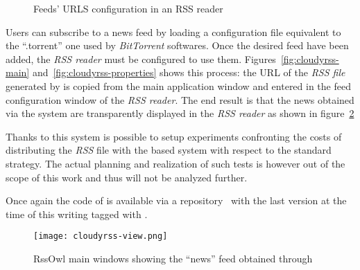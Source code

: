 \begin{figure}[h!]
  \centering
  \caption{Feeds' URLS configuration in an RSS reader}
  \label{fig:cloudyrss-feeds}
\end{figure}

\clearpage
Users can subscribe to a news feed by loading a
configuration file equivalent to the ``.torrent'' one used by
\textit{BitTorrent} softwares. Once the desired feed have been
added, the \textit{RSS reader} must be configured to use them.
Figures~\ref{fig:cloudyrss-main} and~\ref{fig:cloudyrss-properties}
shows this process: the URL of the \textit{RSS file} generated by
\cloudypeer is copied from the main application window and entered in
the feed configuration window of the \textit{RSS reader}.
The end result is that the news obtained via the \cloudcast system are
transparently displayed in the \textit{RSS reader} as shown in
figure~\ref{fig:cloudyrss-view}

Thanks to this system is possible to setup experiments confronting the
costs of distributing the \textit{RSS} file with the
\cloudcast based system with respect to the standard strategy. The actual
planning and realization of such tests is however out of the scope of
this work and thus will not be analyzed further.

Once again the code of \cloudyrss is available via a \github
repository~\cite{cloudyrss-repo} with the last version at the time of
this writing tagged with \thesistag.

\begin{figure}[h!]
  \hspace{-40pt}
  \texttt{[image: cloudyrss-view.png]}
  \caption{RssOwl main windows showing the ``news'' feed obtained
    through \cloudyrss}
  \label{fig:cloudyrss-view}
\end{figure}
